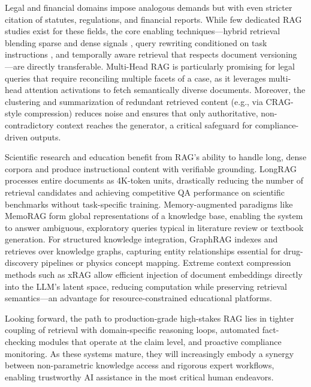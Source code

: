 \documentclass[11pt,a4paper]{article}
\begin{document}
Legal and financial domains impose analogous demands but with even stricter citation of statutes, regulations, and financial reports. While few dedicated RAG studies exist for these fields, the core enabling techniques---hybrid retrieval blending sparse and dense signals \cite{arxiv:2404.07220v1}, query rewriting conditioned on task instructions \cite{arxiv:2405.06683v1}, and temporally aware retrieval that respects document versioning \cite{arxiv:2401.13222v2}---are directly transferable. Multi-Head RAG \cite{arxiv:2406.05085v1} is particularly promising for legal queries that require reconciling multiple facets of a case, as it leverages multi-head attention activations to fetch semantically diverse documents. Moreover, the clustering and summarization of redundant retrieved content (e.g., via CRAG-style compression) reduces noise and ensures that only authoritative, non-contradictory context reaches the generator, a critical safeguard for compliance-driven outputs.

Scientific research and education benefit from RAG's ability to handle long, dense corpora and produce instructional content with verifiable grounding. LongRAG \cite{arxiv:2406.15319v3} processes entire documents as 4K-token units, drastically reducing the number of retrieval candidates and achieving competitive QA performance on scientific benchmarks without task-specific training. Memory-augmented paradigms like MemoRAG \cite{arxiv:2409.05591v2} form global representations of a knowledge base, enabling the system to answer ambiguous, exploratory queries typical in literature review or textbook generation. For structured knowledge integration, GraphRAG \cite{arxiv:2408.08921v2} indexes and retrieves over knowledge graphs, capturing entity relationships essential for drug-discovery pipelines or physics concept mapping. Extreme context compression methods such as xRAG \cite{arxiv:2405.13792v1} allow efficient injection of document embeddings directly into the LLM's latent space, reducing computation while preserving retrieval semantics---an advantage for resource-constrained educational platforms.

Looking forward, the path to production-grade high-stakes RAG lies in tighter coupling of retrieval with domain-specific reasoning loops, automated fact-checking modules that operate at the claim level, and proactive compliance monitoring. As these systems mature, they will increasingly embody a synergy between non-parametric knowledge access and rigorous expert workflows, enabling trustworthy AI assistance in the most critical human endeavors.
\end{document}
